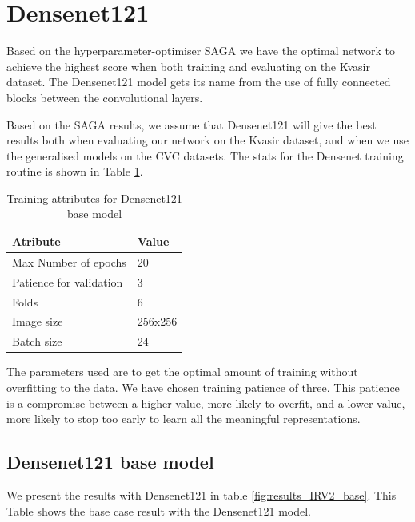 \FloatBarrier
\section{Densenet121}

Based on the hyperparameter-optimiser SAGA we have the optimal network to achieve the highest score when both training and evaluating on the Kvasir dataset. 
The Densenet121 model gets its name from the use of fully connected blocks between the convolutional layers. 

Based on the SAGA results, we assume that Densenet121 will give the best results both when evaluating our network on the Kvasir dataset, and when we use the generalised models on the CVC datasets.
The stats for the Densenet training routine is shown in Table \ref{tab:TrainingAttrDN121}.



\begin{table}[h]
\caption{Training attributes for Densenet121 base model }
\begin{center}
\begin{tabular}{ll}
\toprule
Atribute                & Value   \\
\midrule
Max Number of epochs    & 20      \\
Patience for validation & 3       \\
Folds                   & 6       \\
Image size              & 256x256 \\
Batch size              & 24      \\   
\bottomrule
\end{tabular}
\end{center}
\label{tab:TrainingAttrDN121}
\end{table}

The parameters used are to get the optimal amount of training without overfitting to the data. We have chosen training patience of three. This patience is a compromise between a higher value, more likely to overfit, and a lower value, more likely to stop too early to learn all the meaningful representations. 



\subsection{Densenet121 base model}

We present the results with Densenet121 in table \ref{fig:results_IRV2_base}.
This Table shows the base case result with the Densenet121 model. 

